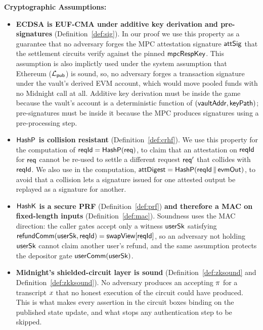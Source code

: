 \vspace{5pt}
\noindent
\textbf{Cryptographic Assumptions:}
\begin{itemize}
    \item \textbf{ECDSA is EUF-CMA under additive key derivation and pre-signatures}
    (Definition~\ref{def:sig}). In our proof we use this property as a guarantee that no adversary forges the MPC
    attestation signature $\mathsf{attSig}$ that the settlement circuits verify against the pinned
    $\mathsf{mpcRespKey}$. This assumption is also implictly used under the system assumption that  Ethereum  ($\mathcal{L}_{\mathsf{pub}}$)  is sound,  so, no adversary forges a transaction signature under the vault's
    derived EVM account, which would move pooled funds with no Midnight call at all. Additive
    key derivation must be inside the game because the vault's account is a deterministic
    function of $(\mathsf{vaultAddr}, \mathsf{keyPath})$; pre-signatures must be inside it because the MPC
     produces signatures using a pre-processing step.

    \item \textbf{$\mathsf{HashP}$ is collision resistant} (Definition~\ref{def:crhf}). We use this property for the computation of
    $\mathsf{reqId} = \mathsf{HashP}(\mathsf{req})$,  to claim that an attestation on $\mathsf{reqId}$ for $\mathsf{req}$ cannot be re-used to settle a different request $\mathsf{req}'$ that collides with  $\mathsf{reqId}$.
    We also use in the computation, $\mathsf{attDigest} = \mathsf{HashP}(\mathsf{reqId} \,\|\, \mathsf{evmOut})$, to avoid that a collision lets a signature issued for one attested output be replayed as a signature for another.


    \item \textbf{$\mathsf{HashK}$ is a secure PRF} (Definition~\ref{def:prf}) \textbf{and therefore a MAC
    on fixed-length inputs} (Definition~\ref{def:mac}). Soundness uses the MAC direction: the
    caller gates accept only a witness $\mathsf{userSk}$ satisfying
    $\mathsf{refundComm}(\mathsf{userSk}, \mathsf{reqId}) = \mathsf{swapView}[\mathsf{reqId}]$, so an adversary not holding $\mathsf{userSk}$
    cannot claim another user's refund, and the same assumption protects the depositor gate
    $\mathsf{userComm}(\mathsf{userSk})$.

    \item \textbf{Midnight's shielded-circuit layer is sound} (Definition~\ref{def:zksound} and Definition~\ref{def:zkksound}).
    No adversary produces an accepting $\pi$ for a transcript $x$ that no honest
    execution of the circuit could have produced. This is what makes every assertion in the
    circuit boxes binding on the published state update, and what stops any authentication step to be skipped.


\end{itemize}
